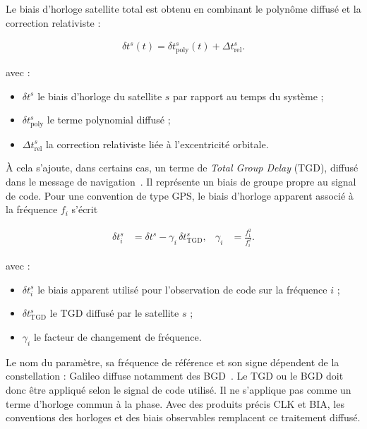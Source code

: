 Le biais d'horloge satellite total est obtenu en combinant le polynôme
diffusé et la correction relativiste :

\begin{align}
\delta t^s(t) = \delta t_{\mathrm{poly}}^s(t)
+ \Delta t_{\mathrm{rel}}^s.
\label{eq:broadcast_satellite_clock}
\end{align}

avec :

\begin{itemize}
    \item $\delta t^s$ le biais d'horloge du satellite $s$ par rapport au
    temps du système ;
    \item $\delta t_{\mathrm{poly}}^s$ le terme polynomial diffusé ;
    \item $\Delta t_{\mathrm{rel}}^s$ la correction relativiste liée à
    l'excentricité orbitale.
\end{itemize}

À cela s'ajoute, dans certains cas, un terme de \textit{Total Group Delay}
(TGD), diffusé dans le message de navigation~\cite{isgps200n}. Il représente un biais de groupe propre au signal de code. Pour une
convention de type GPS, le biais d'horloge apparent associé à la fréquence
$f_i$ s'écrit

\begin{align}
\delta t_i^s
&=
\delta t^s-\gamma_i\,\delta t_{\mathrm{TGD}}^s,
&
\gamma_i
&=
\frac{f_1^2}{f_i^2}.
\label{eq:tgd_signal_clock}
\end{align}

avec :

\begin{itemize}
    \item $\delta t_i^s$ le biais apparent utilisé pour l'observation de code
    sur la fréquence $i$ ;
    \item $\delta t_{\mathrm{TGD}}^s$ le TGD diffusé par le satellite $s$ ;
    \item $\gamma_i$ le facteur de changement de fréquence.
\end{itemize}

Le nom du paramètre, sa fréquence de référence et son signe dépendent de la
constellation : Galileo diffuse notamment des BGD~\cite{galileoOsSisIcd21}. Le TGD ou le BGD doit donc
être appliqué selon le signal de code utilisé. Il ne s'applique pas comme un
terme d'horloge commun à la phase. Avec des produits précis CLK et BIA, les
conventions des horloges et des biais observables remplacent ce traitement
diffusé.

